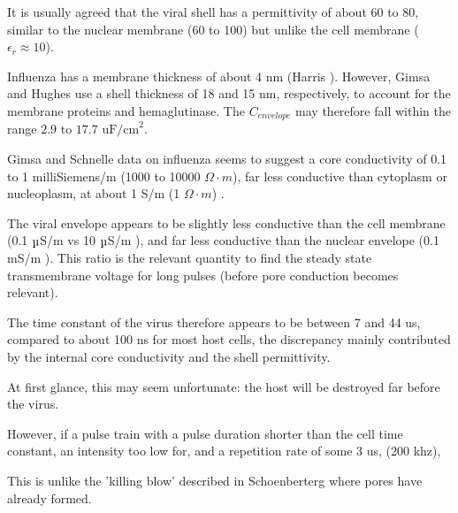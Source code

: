 \documentclass[fleqn,10pt]{article}
\begin{document}
It is usually agreed that the viral shell has a permittivity of about 60 to 80, similar to the nuclear membrane (60 to 100) but unlike the cell membrane ($\epsilon_r\approx 10$). 

Influenza has a membrane thickness of about 4 nm (Harris \cite{Influenza2006}). However, Gimsa and Hughes use a shell thickness of 18 and 15 nm, respectively, to account for the membrane proteins and hemaglutinase. The $C_{envelope}$ may therefore fall within the range $2.9 \text{ to } 17.7 \text{ uF/cm}^2$.


Gimsa and Schnelle data on influenza seems to suggest a core conductivity of 0.1 to 1 milliSiemens/m (1000 to 10000 $\Omega \cdot m$), far less conductive than cytoplasm or nucleoplasm, at about 1 S/m (1 $\Omega \cdot m$) \cite{Study2001}.

The viral envelope appears to be slightly less conductive than the cell membrane (0.1 $\micro$S/m \cite{New1999} vs 10 $\micro$S/m \cite{Study2001}), and far less conductive than the nuclear envelope (0.1 $\text{m}$S/m \cite{Study2001}). This ratio is the relevant quantity to find the steady state transmembrane voltage for long pulses (before pore conduction becomes relevant).

The time constant of the virus therefore appears to be between 7 and 44 us, compared to about 100 ns for most host cells, the discrepancy mainly contributed by the internal core conductivity and the shell permittivity.

At first glance, this may seem unfortunate: the host will be destroyed far before the virus.

However, if a pulse train with a pulse duration shorter than the cell time constant, an intensity too low for, and a repetition rate of some 3 us, (200 khz), 

This is unlike the 'killing blow' described in Schoenberterg where pores have already formed.


















\end{document}
